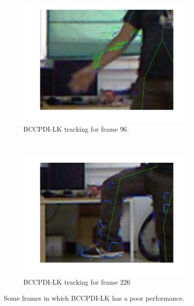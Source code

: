 \begin{figure}[t]
        \begin{subfigure}[b]{0.45\textwidth}
                \centering
                \includegraphics[width=\textwidth, trim=0 0 0 0,clip]{fig32.jpg}
                \caption{BCCPDI-LK tracking for frame $96$.}
                \label{fig:cp02_comparison_oflow_fails_elbow_lk_side}
        \end{subfigure}%
        ~
        \begin{subfigure}[b]{0.45\textwidth}
                \centering
                \includegraphics[width=\textwidth, trim=0 0 0 0,clip]{fig33.jpg}
                \caption{BCCPDI-LK tracking for frame $226$}
                \label{fig:cp02_comparison_oflow_fails_knee_lk_side}
        \end{subfigure}%

        \caption{Some frames in which BCCPDI-LK has a poor performance.}\label{fig:cp02_comparison}
\end{figure}

